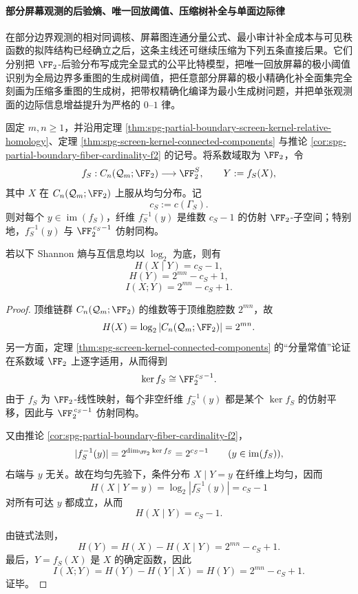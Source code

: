 \paragraph{部分屏幕观测的后验熵、唯一回放阈值、压缩树补全与单面边际律}
在部分边界观测的相对同调核、屏幕图连通分量公式、最小审计补全成本与可见秩函数的拟阵结构已经确立之后，这条主线还可继续压缩为下列五条直接后果。它们分别把 \(\FF_2\)-后验分布写成完全显式的公平比特模型，把唯一回放屏幕的极小阈值识别为全局边界多重图的生成树阈值，把任意部分屏幕的极小精确化补全面集完全刻画为压缩多重图的生成树，把带权精确化编译为最小生成树问题，并把单张观测面的边际信息增益提升为严格的 \(0\text{--}1\) 律。

\begin{theorem}[部分屏幕观测的后验分布完全等价于独立公平比特]\label{thm:xi-time-part65f-screen-posterior-fair-bits}
固定 \(m,n\ge 1\)，并沿用定理 \ref{thm:spg-partial-boundary-screen-kernel-relative-homology}、定理 \ref{thm:spg-screen-kernel-connected-components} 与推论 \ref{cor:spg-partial-boundary-fiber-cardinality-f2} 的记号。将系数域取为 \(\FF_2\)，令
\[
f_S:C_n(\mathcal Q_m;\FF_2)\longrightarrow \FF_2^{S},
\qquad
Y:=f_S(X),
\]
其中 \(X\) 在 \(C_n(\mathcal Q_m;\FF_2)\) 上服从均匀分布。记
\[
c_S:=c(\Gamma_S).
\]
则对每个 \(y\in \operatorname{im}(f_S)\)，纤维 \(f_S^{-1}(y)\) 是维数 \(c_S-1\) 的仿射 \(\FF_2\)-子空间；特别地，\(f_S^{-1}(y)\) 与 \(\FF_2^{\,c_S-1}\) 仿射同构。

若以下 Shannon 熵与互信息均以 \(\log_2\) 为底，则有
\[
H(X\mid Y)=c_S-1,
\]
\[
H(Y)=2^{mn}-c_S+1,
\]
\[
I(X;Y)=2^{mn}-c_S+1.
\]
\end{theorem}
\begin{proof}
顶维链群 \(C_n(\mathcal Q_m;\FF_2)\) 的维数等于顶维胞腔数 \(2^{mn}\)，故
\[
H(X)=\log_2|C_n(\mathcal Q_m;\FF_2)|=2^{mn}.
\]
另一方面，定理 \ref{thm:spg-screen-kernel-connected-components} 的“分量常值”论证在系数域 \(\FF_2\) 上逐字适用，从而得到
\[
\ker f_S\cong \FF_2^{\,c_S-1}.
\]
由于 \(f_S\) 为 \(\FF_2\)-线性映射，每个非空纤维 \(f_S^{-1}(y)\) 都是某个 \(\ker f_S\) 的仿射平移，因此与 \(\FF_2^{\,c_S-1}\) 仿射同构。

又由推论 \ref{cor:spg-partial-boundary-fiber-cardinality-f2}，
\[
|f_S^{-1}(y)|=2^{\dim_{\FF_2}\ker f_S}=2^{c_S-1}
\qquad
(y\in\operatorname{im}(f_S)),
\]
右端与 \(y\) 无关。故在均匀先验下，条件分布 \(X\mid Y=y\) 在纤维上均匀，因而
\[
H(X\mid Y=y)=\log_2|f_S^{-1}(y)|=c_S-1
\]
对所有可达 \(y\) 都成立，从而
\[
H(X\mid Y)=c_S-1.
\]

由链式法则，
\[
H(Y)=H(X)-H(X\mid Y)=2^{mn}-c_S+1.
\]
最后，\(Y=f_S(X)\) 是 \(X\) 的确定函数，因此
\[
I(X;Y)=H(Y)-H(Y\mid X)=H(Y)=2^{mn}-c_S+1.
\]
证毕。
\end{proof}

